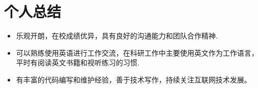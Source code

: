 \documentclass{resume}
\begin{document}
\section{\textbf{个人总结}}

\begin{itemize}
  \item 乐观开朗，在校成绩优异，具有良好的沟通能力和团队合作精神.
  \item 可以熟练使用英语进行工作交流，在科研工作中主要使用英文作为工作语言，平时有阅读英文书籍和视听练习的习惯.
  \item 有丰富的代码编写和维护经验，善于技术写作，持续关注互联网技术发展。
\end{itemize}
\end{document}
